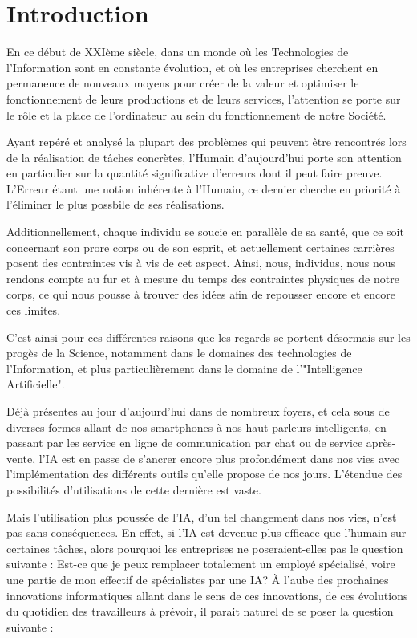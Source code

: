 \chapter{Introduction}

En ce début de XXIème siècle, dans un monde où les Technologies de l'Information sont en constante évolution,
et où les entreprises cherchent en permanence de nouveaux moyens pour créer de la valeur
et optimiser le fonctionnement de leurs productions et de leurs services, l'attention se porte sur le rôle et la place de l'ordinateur au sein du fonctionnement de notre Société.\newline

Ayant repéré et analysé la plupart des problèmes qui peuvent être rencontrés lors de la réalisation de tâches concrètes, l'Humain d'aujourd'hui
porte son attention en particulier sur la quantité significative d'erreurs dont il peut faire preuve.
L'Erreur étant une notion inhérente à l'Humain, ce dernier cherche en priorité à l'éliminer le plus possbile de ses réalisations.\newline

Additionnellement, chaque individu se soucie en parallèle de sa santé, que ce soit concernant son prore corps ou de son esprit,
et actuellement certaines carrières posent des contraintes vis à vis de cet aspect.
Ainsi, nous, individus, nous nous rendons compte au fur et à mesure du temps des contraintes physiques de notre corps, ce qui nous pousse à trouver des
idées afin de repousser encore et encore ces limites.\newline

C'est ainsi pour ces différentes raisons que les regards se portent désormais sur les progès de la Science, notamment dans le domaines des technologies de l'Information,
et plus particulièrement dans le domaine de l'"Intelligence Artificielle".\newline

Déjà présentes au jour d'aujourd'hui dans de nombreux foyers, et cela sous de diverses formes allant de nos smartphones à nos haut-parleurs intelligents,
en passant par les service en ligne de communication par chat ou de service après-vente, l'IA est en passe de s'ancrer encore plus profondément dans nos vies
avec l'implémentation des différents outils qu'elle propose de nos jours. L'étendue des possibilités d'utilisations de cette dernière est vaste.\newline

Mais l'utilisation plus poussée de l'IA, d'un tel changement dans nos vies, n'est pas sans conséquences. En effet, si l'IA est devenue plus efficace que l'humain sur certaines tâches,
alors pourquoi les entreprises ne poseraient-elles pas le question suivante : Est-ce que je peux remplacer totalement un employé spécialisé, voire une partie de mon effectif de spécialistes par une IA?
À l'aube des prochaines innovations informatiques allant dans le sens de ces innovations, de ces évolutions du quotidien des travailleurs à prévoir, il parait naturel de se poser la question suivante :\newline

